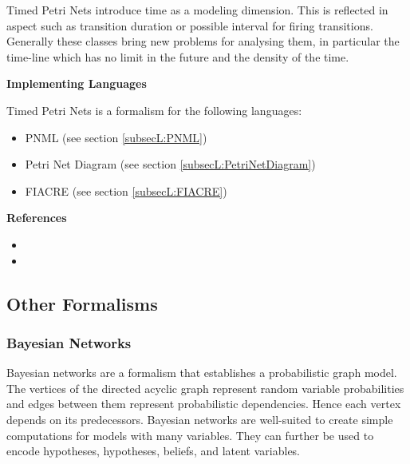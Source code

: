 Timed Petri Nets introduce time as a modeling dimension. This is reflected in aspect such as transition duration or possible interval for firing transitions. Generally these classes bring new problems for analysing them, in particular the time-line which has no limit in the future and the density of the time.

\textbf{Implementing Languages}

Timed Petri Nets is a formalism for the following languages:
\begin{itemize}
	\item PNML (see section \ref{subsecL:PNML})
	\item Petri Net Diagram (see section \ref{subsecL:PetriNetDiagram})
	\item FIACRE (see section \ref{subsecL:FIACRE})
\end{itemize}





\textbf{References}
\begin{itemize}
	
\item {}
	
\item {}
\end{itemize}

\subsection{Other Formalisms}

\subsubsection{Bayesian Networks}
\label{subsecF:BayesianNetworks}


Bayesian networks are a formalism that establishes a probabilistic graph model.
The vertices of the directed acyclic graph represent random variable probabilities and edges between them represent probabilistic dependencies. Hence each vertex depends on its predecessors.
Bayesian networks are well-suited to create simple computations for models with many variables.
They can further be used to encode hypotheses, hypotheses, beliefs, and latent variables.

